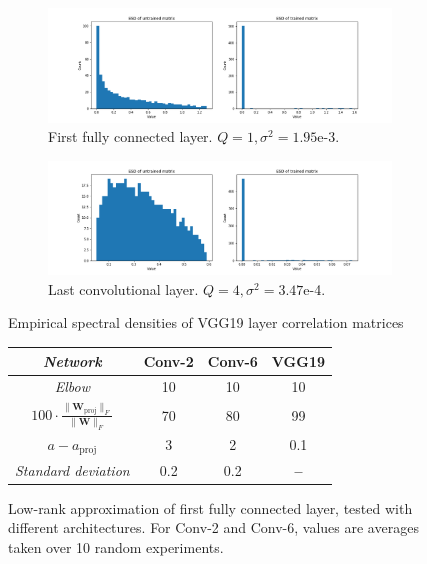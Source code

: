 \begin{figure}[H]
\centering
\begin{subfigure}[b]{\textwidth}
   \includegraphics[width=1\linewidth]{images/vgg-fc1-svd-comp.png}
   \caption{First fully connected layer. $Q = 1, \sigma^2 = 1.95$e-3.}
   \label{fig:vgg-conv16-svd-comp}
\end{subfigure}

\begin{subfigure}[b]{\textwidth}
   \includegraphics[width=1\linewidth]{images/vgg-conv16-svd-comp.png}
   \caption{Last convolutional layer. $Q = 4, \sigma^2 = 3.47$e-4.}
   \label{fig:vgg-conv16-svd-comp} 
\end{subfigure}
\caption{Empirical spectral densities of VGG19 layer correlation matrices}
\end{figure}

\begin{figure}[H]
\centering
\scalebox{0.9}
{\begin{tabular}{SSSS} \toprule
    {\textit{Network}} & {Conv-2} & {Conv-6} & {VGG19} \\ \midrule
    {\textit{Elbow}} & {10} & {10} & {10} \\
    {$100 \cdot \frac{ \| \textbf{W}_{\text{proj}} \|_F }{ \| \textbf{W} \|_F }$}  & {70} & {80} & {99} \\
    {$a - a_{\text{proj}}$}  & {3} & {2} & {0.1} \\
    {\textit{Standard deviation}} & {0.2} & {0.2} & {\textbf{--}}\\ \bottomrule
\end{tabular}}
\caption{Low-rank approximation of first fully connected layer, tested with different architectures. For Conv-2 and Conv-6, values are averages taken over 10 random experiments.}
\end{figure}

